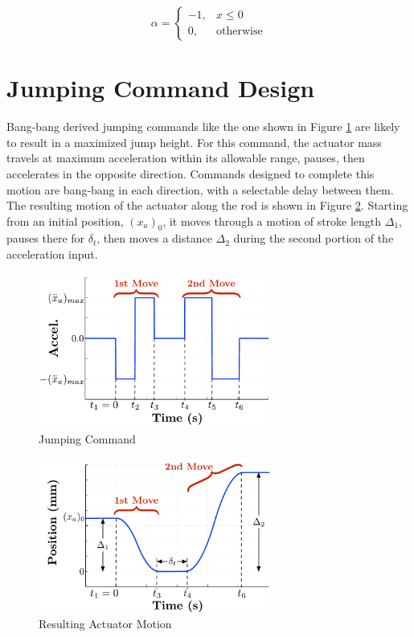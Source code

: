 \documentclass[twocolumn,10pt]{asme2e}
\begin{document}
	\begin{equation}
		\alpha =
		\left\{\begin{matrix}
		   -1, & x \leq 0\\ 
		   0, & \mbox{otherwise}
		   \end{matrix}\right.
	 \end{equation}


\section{Jumping Command Design}
\label{sec:control_input_exp}
%
Bang-bang derived jumping commands like the one shown in Figure \ref{fig:sim_command} are likely to result in a maximized jump height. For this command, the actuator mass travels at maximum acceleration within its allowable range, pauses, then accelerates in the opposite direction. Commands designed to complete this motion are bang-bang in each direction, with a selectable delay between them. The resulting motion of the actuator along the rod is shown in Figure \ref{fig:command_act_motion}. Starting from an initial position, $(x_a)_0$, it moves through a motion of stroke length $\Delta_1$, pauses there for $\delta_t$, then moves a distance $\Delta_2$ during the second portion of the acceleration input.
%
%
\begin{figure}[b]
\begin{center}
\includegraphics[width = 3in]{figures/command_form}  
\caption{Jumping Command}
\label{fig:sim_command}
\end{center}
\vspace{-0.1in}
\end{figure}
%
%
\begin{figure}[tb]
\begin{center}
\includegraphics[width = 3in]{figures/jumping_command_position}  
\caption{Resulting Actuator Motion}
\label{fig:command_act_motion}
\end{center}
\end{figure}
%
\end{document}
